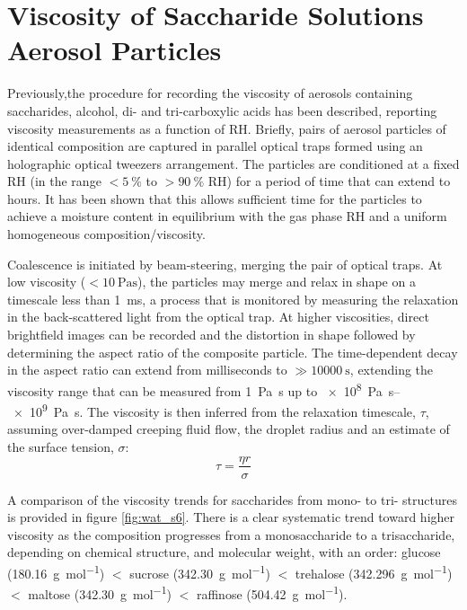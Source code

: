 \section{Viscosity of Saccharide Solutions Aerosol Particles}

Previously,the procedure for recording the viscosity of aerosols containing saccharides, alcohol, di- and tri-carboxylic acids  has been described, reporting viscosity measurements as a function of RH.\cite{powerProbingMicrorheologicalProperties2014}\cite{Song2016a}\cite{powerTransitionLiquidSolidlike2013} Briefly, pairs of aerosol particles of identical composition are captured in parallel optical traps formed using an holographic optical tweezers arrangement. The particles are conditioned at a fixed RH (in the range $<\SI{5}{\percent}$ to $>\SI{90}{\percent}$ RH) for a period of time that can extend to hours. It has been shown that this allows sufficient time for the particles to achieve a moisture content in equilibrium with the gas phase RH and a uniform homogeneous composition/viscosity.\cite{Song2016a} 

Coalescence is initiated by beam-steering, merging the pair of optical traps. At low viscosity ($<\SI{10}{\pascal\second}$), the particles may merge and relax in shape on a timescale less than \SI{1}{\milli\second}, a process that is monitored by measuring the relaxation in the back-scattered light from the optical trap. At higher viscosities, direct brightfield images can be recorded and the distortion in shape followed by determining the aspect ratio of the composite particle. The time-dependent decay in the aspect ratio can extend from milliseconds to $\gg \SI{10000}{\second}$, extending the viscosity range that can be measured from \SI{1}{\pascal\second}  up to \SIrange[range-phrase=--]{e8}{e9}{\pascal\second}\cite{Song2016a}. The viscosity is then inferred from the relaxation timescale, $\tau$, assuming over-damped creeping fluid flow, the droplet radius and an estimate of the surface tension, $\sigma$:
\begin{equation}
\tau=\frac{\eta r}{\sigma}
\end{equation}

A comparison of the viscosity trends for saccharides from mono- to tri- structures is provided in figure \ref{fig:wat_s6}. There is a clear systematic trend toward higher viscosity as the composition progresses from a monosaccharide to a trisaccharide, depending on chemical structure, and molecular weight, with an order: glucose (\SI{180.16}{\gram\per\mole}) $<$ sucrose (\SI{342.30}{\gram\per\mol}) $<$ trehalose (\SI{342.296}{\gram\per\mol}) $<$ maltose (\SI{342.30}{\gram\per\mol}) $<$ raffinose (\SI{504.42}{\gram\per\mol}).


